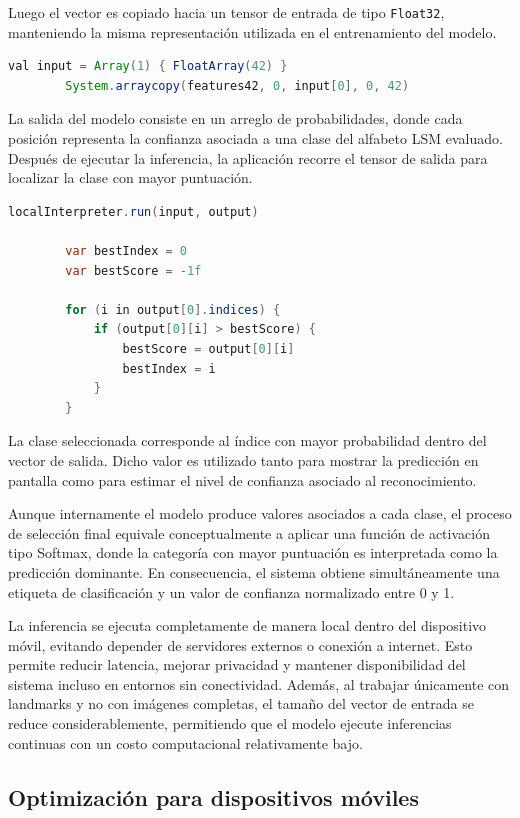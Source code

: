 	Luego el vector es copiado hacia un tensor de entrada de tipo \texttt{Float32}, manteniendo la misma representación utilizada en el entrenamiento del modelo.
	
	\begin{lstlisting}[language=Java]
		val input = Array(1) { FloatArray(42) }
		System.arraycopy(features42, 0, input[0], 0, 42)
	\end{lstlisting}
	
	La salida del modelo consiste en un arreglo de probabilidades, donde cada posición representa la confianza asociada a una clase del alfabeto LSM evaluado. Después de ejecutar la inferencia, la aplicación recorre el tensor de salida para localizar la clase con mayor puntuación.
	
	\begin{lstlisting}[language=Java]
		localInterpreter.run(input, output)
		
		var bestIndex = 0
		var bestScore = -1f
		
		for (i in output[0].indices) {
			if (output[0][i] > bestScore) {
				bestScore = output[0][i]
				bestIndex = i
			}
		}
	\end{lstlisting}
	
	La clase seleccionada corresponde al índice con mayor probabilidad dentro del vector de salida. Dicho valor es utilizado tanto para mostrar la predicción en pantalla como para estimar el nivel de confianza asociado al reconocimiento.
	
	Aunque internamente el modelo produce valores asociados a cada clase, el proceso de selección final equivale conceptualmente a aplicar una función de activación tipo Softmax, donde la categoría con mayor puntuación es interpretada como la predicción dominante. En consecuencia, el sistema obtiene simultáneamente una etiqueta de clasificación y un valor de confianza normalizado entre 0 y 1.
	
	La inferencia se ejecuta completamente de manera local dentro del dispositivo móvil, evitando depender de servidores externos o conexión a internet. Esto permite reducir latencia, mejorar privacidad y mantener disponibilidad del sistema incluso en entornos sin conectividad. Además, al trabajar únicamente con landmarks y no con imágenes completas, el tamaño del vector de entrada se reduce considerablemente, permitiendo que el modelo ejecute inferencias continuas con un costo computacional relativamente bajo.
	
	\subsection{Optimización para dispositivos móviles}
	
